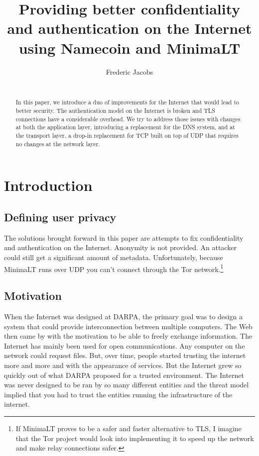 \documentclass{vldb}
\begin{document}
\title{Providing better confidentiality and authentication on the Internet using Namecoin and MinimaLT}

\author{
\alignauthor
Frederic Jacobs\\
\\
}

\maketitle

\begin{abstract}
In this paper, we introduce a duo of improvements for the Internet that would lead to better security. The authentication model on the Internet is broken and TLS connections have a considerable overhead. We try to address those issues with changes at both the application layer, introducing a replacement for the DNS system, and at the transport layer, a drop-in replacement for TCP built on top of UDP that requires no changes at the network layer.
\end{abstract}

\section{Introduction}

\subsection{Defining user privacy}
The solutions brought forward in this paper are attempts to fix confidentiality and authentication on the Internet. Anonymity is not provided. An attacker could still get a significant amount of metadata. Unfortunately, because MinimaLT runs over UDP you can't connect through the Tor network.\footnote{If MinimaLT proves to be a safer and faster alternative to TLS, I imagine that the Tor project would look into implementing it to speed up the network and make relay connections safer.}
\subsection{Motivation}

When the Internet was designed at DARPA, the primary goal was to design a system that could provide interconnection between multiple computers. The Web then came by with the motivation to be able to freely exchange information. The Internet has mainly been used for open communications. Any computer on the network could request files. But, over time, people started trusting the internet more and more and with the appearance of services. But the Internet grew so quickly out of what DARPA proposed for a trusted environment. The Internet was never designed to be ran by so many different entities and the threat model implied that you had to trust the entities running the infrastructure of the internet.
\end{document}
